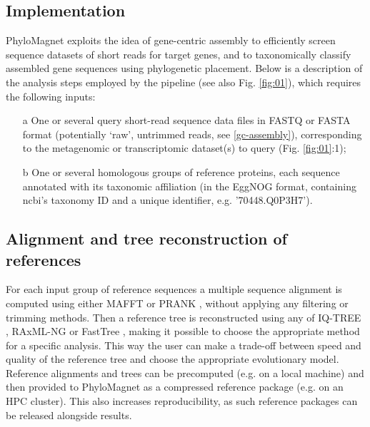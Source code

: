 \documentclass{bioinfo}
\begin{document}
\begin{methods}
\section{Implementation}\label{implementation}
PhyloMagnet exploits the idea of gene-centric assembly \citep{Huson2017} to efficiently screen sequence datasets  of short reads for target genes, and to taxonomically classify assembled gene sequences using phylogenetic placement. Below is a description of the analysis steps employed by the pipeline (see also Fig. \ref{fig:01}), which requires the following inputs: 
\begin{enumerate}

\item[a] One or several query short-read sequence data files in FASTQ or FASTA format (potentially ‘raw’, untrimmed reads, see \ref{gc-assembly}), corresponding to the metagenomic or transcriptomic dataset(s) to query (Fig. \ref{fig:01}:1);
\item[b] One or several homologous groups of reference proteins, each sequence annotated with its taxonomic affiliation (in the EggNOG format, containing ncbi’s taxonomy ID and a unique identifier, e.g. '70448.Q0P3H7').
\end{enumerate}

\subsection{Alignment and tree reconstruction of references}
For each input group of reference sequences a multiple sequence alignment is computed using either MAFFT \citep{Katoh2013} or PRANK \citep{Loytynoja2010}, without applying any filtering or trimming methods. Then a reference tree is reconstructed using any of IQ-TREE \citep{Nguyen2015}, RAxML-NG \citep{Stamatakis2014, Kozlov2019} or FastTree \citep{Price2010}, making it possible to choose the appropriate method for a specific analysis. This way the user can make a trade-off between speed and quality of the reference tree and choose the appropriate evolutionary model. Reference alignments and trees can be precomputed (e.g. on a local machine) and then provided to PhyloMagnet as a compressed reference package (e.g. on an HPC cluster). This also increases reproducibility, as such reference packages can be released alongside results.


\end{methods}
\end{document}
